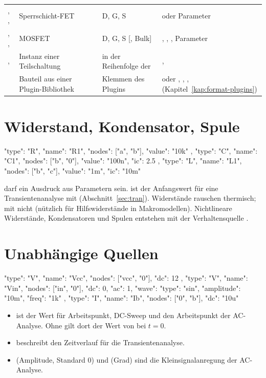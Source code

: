 \begin{longtable}{@{}P{2.6cm}P{3.6cm}P{2.6cm}P{5.0cm}@{}}
  , ,  & Sperrschicht-FET & D, G, S &  oder Parameter \\
  , ,  & MOSFET & D, G, S [, Bulk] & , , , Parameter \\
  ,  & Instanz einer Teilschaltung & in der Reihenfolge der  & ,  \\
   & Bauteil aus einer Plugin-Bibliothek & Klemmen des Plugins &  oder , , ,  (Kapitel~\ref{kap:format-plugins}) \\
\end{longtable}

\section{Widerstand, Kondensator, Spule}

\begin{json}
{ "type": "R", "name": "R1", "nodes": ["a", "b"], "value": "10k" },
{ "type": "C", "name": "C1", "nodes": ["b", "0"], "value": "100n", "ic": 2.5 },
{ "type": "L", "name": "L1", "nodes": ["b", "c"], "value": "1m",   "ic": "10m" }
\end{json}

 darf ein Ausdruck aus Parametern sein.  ist der
Anfangswert für eine Transientenanalyse mit 
(Abschnitt~\ref{sec:tran}). Widerstände rauschen thermisch; mit
 nicht (nützlich für Hilfswiderstände in
Makromodellen). Nichtlineare Widerstände, Kondensatoren und Spulen
entstehen mit der Verhaltensquelle .

\section{Unabhängige Quellen}
\label{sec:quellen}

\begin{json}
{ "type": "V", "name": "Vcc", "nodes": ["vcc", "0"], "dc": 12 },
{ "type": "V", "name": "Vin", "nodes": ["in", "0"], "dc": 0, "ac": 1,
  "wave": { "type": "sin", "amplitude": "10m", "freq": "1k" } },
{ "type": "I", "name": "Ib", "nodes": ["0", "b"], "dc": "10u" }
\end{json}

\begin{itemize}
  \item {} ist der Wert für Arbeitspunkt, DC-Sweep und den
    Arbeitspunkt der AC-Analyse. Ohne  gilt dort der Wert von
     bei $t=0$.
  \item {} beschreibt den Zeitverlauf für die Transientenanalyse.
  \item {} (Amplitude, Standard 0) und  (Grad) sind die
    Kleinsignalanregung der AC-Analyse.
\end{itemize}

